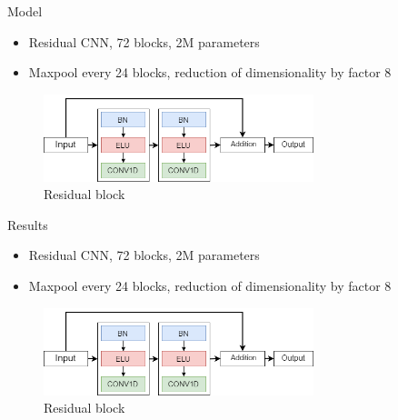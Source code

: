 \documentclass[10pt]{beamer}
\begin{document}
\begin{frame}[fragile]{Model}
	\begin{itemize}
		\item Residual CNN, 72 blocks, 2M parameters
		\item Maxpool every 24 blocks, reduction of dimensionality by factor 8
	\end{itemize}
	\begin{figure}
		\caption{Residual block}
		\begin{center}
			\includegraphics[width=0.7\textwidth]{./imgs/model/block_small.png}%

		\end{center}
	\end{figure}
\end{frame}



\begin{frame}[fragile]{Results}
	\begin{itemize}
		\item Residual CNN, 72 blocks, 2M parameters
		\item Maxpool every 24 blocks, reduction of dimensionality by factor 8
	\end{itemize}
	\begin{figure}
		\caption{Residual block}
		\begin{center}
			\includegraphics[width=0.7\textwidth]{./imgs/model/block_small.png}%
			
		\end{center}
	\end{figure}
\end{frame}
\end{document}
